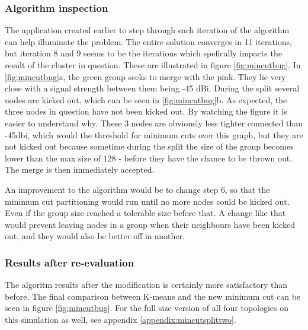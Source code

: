 \subsubsection{Algorithm inspection}
The application created earlier to step through each iteration of the algorithm can help illuminate the problem.
The entire solution converges in 11 iterations, but iteration 8 and 9 seems to be the iterations which spefically impacts the result of the cluster in question.
These are illustrated in figure \ref{fig:mincutbug}. In \ref{fig:mincutbug}a, the green group seeks to merge with the pink. They lie very close with a signal strength between them being -45 dBi.
During the split several nodes are kicked out, which can be seen in \ref{fig:mincutbug}b. As expected, the three nodes in question have not been kicked out. By watching the figure it is easier to understand why.
These 3 nodes are obviously less tighter connected than -45dbi, which would the threshold for minimum cuts over this graph, but they are not kicked out because sometime during the split the size of the group becomes lower than the max size of $128$ - before they have the chance to be thrown out. The merge is then immediately accepted. 

An improvement to the algorithm would be to change step 6, so that the minimum cut partitioning would run until no more nodes could be kicked out. Even if the group size reached a tolerable size before that. A change
like that would prevent leaving nodes in a group when their neighbours have been kicked out, and they would also be better off in another. 

\subsubsection{Results after re-evaluation}
The algoritm results after the modification is certainly more satisfactory than before. The final comparison between K-means and the new minimum cut can be seen in figure \ref{fig:mincutbug}. For the full size version of
all four topologies on this simulation as well, see appendix \ref{appendix:mincutsplittwo}. 

